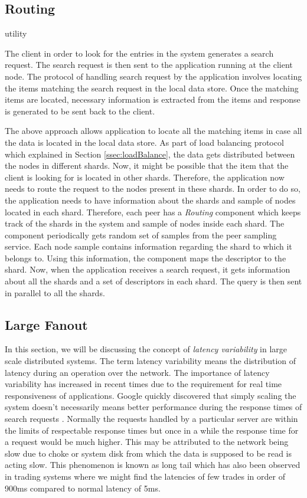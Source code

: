 \documentclass[12pt,a4paper,twoside,openright]{book}
\begin{document}
\subsection{Routing}
\label{ssec:routing}
utility
\par The client in order to look for the entries in the system generates a search request. The search request is then sent to the application running at the client node. The protocol of handling search request by the application involves locating the items matching the search request in the local data store. Once the matching items are located, necessary information is extracted from the items and response is generated to be sent back to the client. 

\par The above approach allows application to locate all the matching items in case all the data is located in the local data store. As part of load balancing protocol which explained in Section \ref{ssec:loadBalance}, the data gets distributed between the nodes in different shards. Now, it might be possible that the item that the client is looking for is located in other shards. Therefore, the application now needs to route the request to the nodes present in these shards. In order to do so, the application needs to have information about the shards and sample of nodes located in each shard. Therefore, each peer has a \textit{Routing} component which keeps track of the shards in the system and sample of nodes inside each shard. The component periodically gets random set of samples from the peer sampling service. Each node sample contains information regarding the shard to which it belongs to. Using this information, the component maps the descriptor to the shard. Now, when the application receives a search request, it gets information about all the shards and a set of descriptors in each shard. The query is then sent in parallel to all the shards. 


\subsection{Large Fanout}

In this section, we will be discussing the concept of \textit{latency variability} in large scale distributed systems. The term latency variability means the distribution of latency during an operation over the network. The importance of latency variability has increased in recent times due to the requirement for real time responsiveness of applications. Google quickly discovered that simply scaling the system doesn't necessarily means better performance during the response times of search requests \cite{tamingTail}. Normally the requests handled by a particular server are within the limits of respectable response times but once in a while the response time for a request would be much higher. This may be attributed to the network being slow due to choke or system disk from which the data is supposed to be read is acting slow. This phenomenon is known as long tail which has also been observed in trading systems where we might find the latencies of few trades in order of 900ms compared to normal latency of 5ms. 
\end{document}
